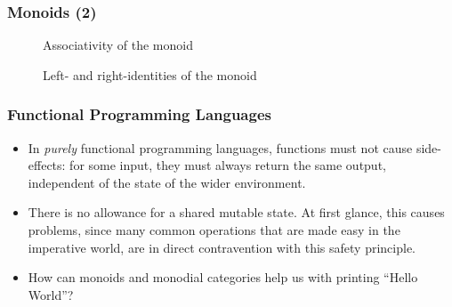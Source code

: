 \documentclass{beamer}
\numberwithin{figure}{section}
\begin{document}
\begin{frame}
        \frametitle{Monoids (2)}
        \begin{figure}
                \caption{Associativity of the monoid}
        \end{figure}

        \vfill
        \pause
        \begin{figure}
                \caption{Left- and right-identities of the monoid}
        \end{figure}
\end{frame}

\begin{frame}
        \frametitle{Functional Programming Languages}
        \begin{itemize}
                \item In \textit{purely} functional programming languages,
                        functions must not cause side-effects: for some input,
                        they must always return the same output, independent of
                        the state of the wider environment.
                \item There is no allowance for a shared mutable state. At first
                        glance, this causes problems, since many common
                        operations that are made easy in the imperative world,
                        are in direct contravention with this safety principle.
                \item How can monoids and monodial categories help us with
                        printing ``Hello World''?
        \end{itemize}
\end{frame}
\end{document}
